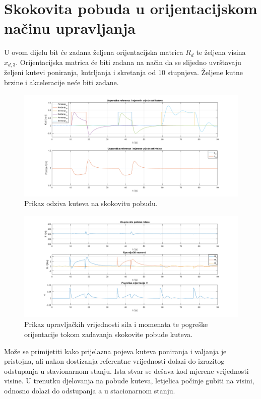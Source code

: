 \documentclass[times, utf8, diplomski, numeric]{fer}
\begin{document}
	\section{Skokovita pobuda u orijentacijskom načinu upravljanja}
	U ovom dijelu bit će zadana željena orijentacijska matrica $R_d$ te željena visina $x_{d,3}$. Orijentacijska matrica će biti zadana na način da se slijedno uvrštavaju željeni kutevi poniranja, kotrljanja i skretanja od 10 stupnjeva. Željene kutne brzine i akceleracije neće biti zadane. 
	\begin{figure}[h!]
		\includegraphics[width=\textwidth]{plots/orientation_euler.png}
		\caption{Prikaz odziva kuteva na skokovitu pobudu.}
	\end{figure}
	
	\newpage
	\clearpage
	
	\begin{figure}[h!]
		\includegraphics[width=\textwidth]{plots/orientation_forces_moments.png}
		\caption{Prikaz upravljačkih vrijednosti sila i momenata te pogreške orijentacije tokom zadavanja skokovite pobude kuteva.}
	\end{figure}
	Može se primijetiti kako prijelazna pojeva kuteva poniranja i valjanja je pristojna, ali nakon dostizanja referentne vrijednosti dolazi do izrazitog odstupanja u stavionarnom stanju. Ista stvar se dešava kod mjerene vrijednosti visine. U trenutku djelovanja na pobude kuteva, letjelica počinje gubiti na visini, odnosno dolazi do odstupanja a u stacionarnom stanju.
	
\end{document}
